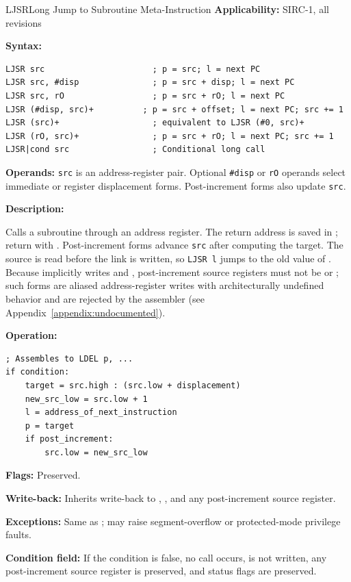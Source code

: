 \begin{instructionbox}{LJSR}{Long Jump to Subroutine Meta-Instruction}
	\textbf{Applicability:} SIRC-1, all revisions

	\textbf{Syntax:}
	\begin{lstlisting}
LJSR src                      ; p = src; l = next PC
LJSR src, #disp               ; p = src + disp; l = next PC
LJSR src, rO                  ; p = src + rO; l = next PC
LJSR (#disp, src)+          ; p = src + offset; l = next PC; src += 1
LJSR (src)+                   ; equivalent to LJSR (#0, src)+
LJSR (rO, src)+               ; p = src + rO; l = next PC; src += 1
LJSR|cond src                 ; Conditional long call
\end{lstlisting}

	\textbf{Operands:} \texttt{src} is an address-register pair. Optional \texttt{\#disp} or \texttt{rO} operands select
	immediate or register displacement forms. Post-increment forms also update \texttt{src}.

	\textbf{Description:}

	Calls a subroutine through an address register. The return address is saved in ; return with .
	Post-increment forms advance \texttt{src} after computing the target. The source is read before the link is written, so
	\texttt{LJSR l} jumps to the old value of . Because  implicitly writes  and ,
	post-increment source registers must not be  or ; such forms are aliased address-register writes with
	architecturally undefined behavior and are rejected by the assembler (see Appendix~\ref{appendix:undocumented}).

	\textbf{Operation:}
	\begin{verbatim}
; Assembles to LDEL p, ...
if condition:
    target = src.high : (src.low + displacement)
    new_src_low = src.low + 1
    l = address_of_next_instruction
    p = target
    if post_increment:
        src.low = new_src_low
\end{verbatim}

	\textbf{Flags:} Preserved.

	\textbf{Write-back:} Inherits  write-back to , , and any post-increment source register.

	\textbf{Exceptions:} Same as ; may raise segment-overflow or protected-mode privilege faults.

	\textbf{Condition field:} If the condition is false, no call occurs,  is not written, any post-increment source
	register is preserved, and status flags are preserved.


\end{instructionbox}
